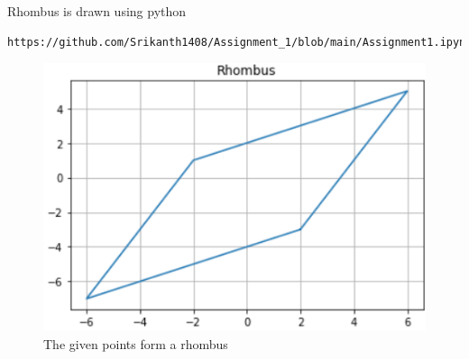 \documentclass{article}
\begin{document}
{Rhombus is drawn using python}
\begin{lstlisting}
https://github.com/Srikanth1408/Assignment_1/blob/main/Assignment1.ipynb
\end{lstlisting}
\begin{figure}[!ht]
	\centering
	\includegraphics[width=\columnwidth]{rhombus.png}
	\caption{The given points form a rhombus}
\end{figure}
\end{document}
